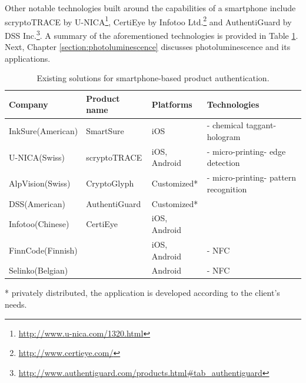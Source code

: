 \documentclass[thesis.tex]{subfiles}
\begin{document}
Other notable technologies built around the capabilities of a smartphone include scryptoTRACE\textregistered{} by U-NICA\footnote{\url{http://www.u-nica.com/1320.html}}, CertiEye by Infotoo Ltd.\footnote{\url{http://www.certieye.com/}} and AuthentiGuard by DSS Inc.\footnote{\url{http://www.authentiguard.com/products.html\#tab_authentiguard}}. A summary of the aforementioned technologies is provided in Table \ref{table:existing-solutions}. Next, Chapter \ref{section:photoluminescence} discusses photoluminescence and its applications.

\begin{table}[hb]
	\caption{Existing solutions for smartphone-based product authentication.} \label{table:existing-solutions}

	\begin{center}
	\begin{tabular}{| m{2cm} | m{3.25cm} | m{3cm} | m{3.75cm} |}

		\hline
		\textbf{Company}				&	\textbf{Product name}			&	\textbf{Platforms}			&	\textbf{Technologies} \\ \hline
		InkSure\newline (American)		&	SmartSure						&	iOS						&	- chemical taggant\newline- hologram \\ \hline
		U-NICA\newline (Swiss)			&	scryptoTRACE\textregistered		&	iOS, Android				&	- micro-printing\newline- edge detection \\ \hline
		AlpVision\newline (Swiss)		&	CryptoGlyph\textregistered		&	Customized\footnotesize{*}	&	- micro-printing\newline- pattern recognition \\ \hline
		DSS\newline (American)			&	AuthentiGuard					&	Customized\footnotesize{*}	&	 \\ \hline
		Infotoo\newline (Chinese)		&	CertiEye						&	iOS, Android				&	 \\ \hline
		FinnCode\newline (Finnish)		&									&	iOS, Android				&	- NFC \\ \hline
		Selinko\newline (Belgian)		&									&	Android						&	- NFC \\
		\hline
	\end{tabular}
	\end{center}
	\scriptsize{*} \small{privately distributed, the application is developed according to the client's needs.}
\end{table}
\end{document}
